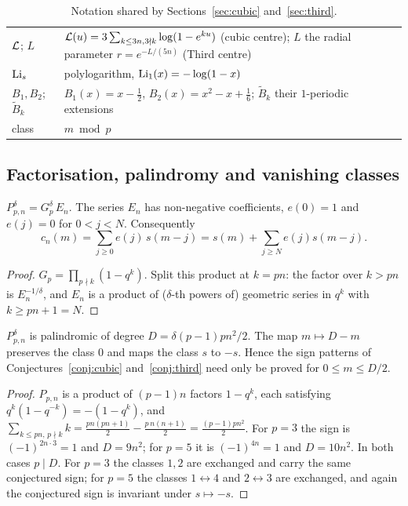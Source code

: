 \begin{table}[h]
\begin{tabular}{@{}p{}p{}@{}}
$\mathcal L$; $L$ & $\mathcal L(u)=3\sum_{k\le3n,3\nmid k}\log(1-e^{ku})$ (cubic centre); $L$ the radial parameter $r=e^{-L/(5n)}$
(Third centre)\\
$\operatorname{Li}_s$ & polylogarithm, $\operatorname{Li}_1(x)=-\log(1-x)$\\
$B_1,B_2$; $\tilde B_k$ & $B_1(x)=x-\frac12$, $B_2(x)=x^2-x+\frac16$; $\tilde B_k$ their $1$-periodic extensions\\
class & $m\bmod p$\\
\bottomrule
\end{tabular}
\caption{Notation shared by Sections~\ref{sec:cubic} and~\ref{sec:third}.}
\label{tab:notation}
\end{table}

\subsection{Factorisation, palindromy and vanishing classes}

\begin{lemma}[factorisation]\label{lem:factor}
$P_{p,n}^\delta=G_p^\delta\,E_n$. The series $E_n$ has non-negative coefficients, $e(0)=1$ and $e(j)=0$ for $0<j<N$.
Consequently
\[
c_n(m)=\sum_{j\ge0}e(j)\,s(m-j)=s(m)+\sum_{j\ge N}e(j)s(m-j).
\]
\end{lemma}
\begin{proof}
$G_p=\prod_{p\nmid k}(1-q^k)$. Split this product at $k=pn$: the factor over $k>pn$ is $E_n^{-1/\delta}$, and $E_n$ is a
product of ($\delta$-th powers of) geometric series in $q^k$ with $k\ge pn+1=N$.
\end{proof}

\begin{lemma}[palindromy]\label{lem:palin}
$P_{p,n}^\delta$ is palindromic of degree $D=\delta(p-1)pn^2/2$. The map $m\mapsto D-m$ preserves the class $0$ and maps
the class $s$ to $-s$. Hence the sign patterns of Conjectures~\ref{conj:cubic} and~\ref{conj:third} need only be proved
for $0\le m\le D/2$.
\end{lemma}
\begin{proof}
$P_{p,n}$ is a product of $(p-1)n$ factors $1-q^k$, each satisfying $q^k(1-q^{-k})=-(1-q^k)$, and
$\sum_{k\le pn,\,p\nmid k}k=\frac{pn(pn+1)}2-\frac{p\,n(n+1)}2=\frac{(p-1)pn^2}{2}$. For $p=3$ the sign is
$(-1)^{2n\cdot3}=1$ and $D=9n^2$; for $p=5$ it is $(-1)^{4n}=1$ and $D=10n^2$. In both cases $p\mid D$. For $p=3$ the
classes $1,2$ are exchanged and carry the same conjectured sign; for $p=5$ the classes $1\leftrightarrow4$ and
$2\leftrightarrow3$ are exchanged, and again the conjectured sign is invariant under $s\mapsto-s$.
\end{proof}

